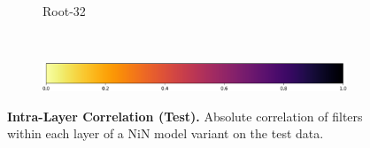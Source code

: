 \documentclass[thesis]{subfiles}
\begin{document}
{\begin{landscape}
\begin{figure}[p]
\begin{subfigure}[c]{0.75\paperheight}
					\hfill
					\hfill
					\hfill
					\hfill
					\caption{Root-32}\label{fig:corrroot32test}
					\vspace*{0.6em}
				\end{subfigure}\\
				\begin{subfigure}[c]{0.77\paperheight}
    				\centering
	    			\includegraphics[width=0.4\linewidth]{Figs/PDF/colorbar}
				\end{subfigure}
				\caption[Intra-layer filter correlation (test)]{\textbf{ Intra-Layer Correlation (Test).} Absolute correlation of filters within each layer of a NiN model variant on the test data.}
				\label{fig:nincorrtest}
			\end{figure}
		\end{landscape}
		}%
\end{document}
